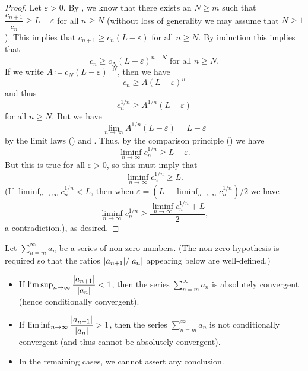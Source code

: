 \begin{proof}
  Let \(\varepsilon > 0\).
  By , we know that there exists an \(N \geq m\) such that \(\dfrac{c_{n + 1}}{c_n} \geq L - \varepsilon\) for all \(n \geq N\)
  (without loss of generality we may assume that \(N \geq 1\)).
  This implies that \(c_{n + 1} \geq c_n (L - \varepsilon)\) for all \(n \geq N\).
  By induction this implies that
  \[
    c_n \geq c_N (L - \varepsilon)^{n - N} \text{ for all } n \geq N.
  \]
  If we write \(A \coloneqq c_N (L - \varepsilon)^{-N}\), then we have
  \[
    c_n \geq A(L - \varepsilon)^n
  \]
  and thus
  \[
    c_n^{1 / n} \geq A^{1 / n} (L - \varepsilon)
  \]
  for all \(n \geq N\).
  But we have
  \[
    \lim_{n \to \infty} A^{1 / n} (L - \varepsilon) = L - \varepsilon
  \]
  by the limit laws () and .
  Thus, by the comparison principle () we have
  \[
    \liminf_{n \to \infty} c_n^{1 / n} \geq L - \varepsilon.
  \]
  But this is true for all \(\varepsilon > 0\), so this must imply that
  \[
    \liminf_{n \to \infty} c_n^{1 / n} \geq L.
  \]
  (If \(\liminf_{n \to \infty} c_n^{1 / n} < L\), then when \(\varepsilon = (L - \liminf_{n \to \infty} c_n^{1 / n}) / 2\) we have
  \[
    \liminf_{n \to \infty} c_n^{1 / n} \geq \dfrac{\liminf_{n \to \infty} c_n^{1 / n} + L}{2},
  \]
  a contradiction.), as desired.
\end{proof}

\begin{cor}\label{i:7.5.3}
  Let \(\sum_{n = m}^\infty a_n\) be a series of non-zero numbers.
  (The non-zero hypothesis is required so that the ratios \(\abs{a_{n + 1}} / \abs{a_n}\) appearing below are well-defined.)
  \begin{itemize}
    \item If \(\limsup_{n \to \infty} \dfrac{\left\lvert a_{n + 1}\right\rvert}{\left\lvert a_n\right\rvert} < 1\), then the series \(\sum_{n = m}^\infty a_n\) is absolutely convergent (hence conditionally convergent).
    \item If \(\liminf_{n \to \infty} \dfrac{\left\lvert a_{n + 1}\right\rvert}{\left\lvert a_n\right\rvert} > 1\), then the series \(\sum_{n = m}^\infty a_n\) is not conditionally convergent (and thus cannot be absolutely convergent).
    \item In the remaining cases, we cannot assert any conclusion.
  \end{itemize}
\end{cor}

